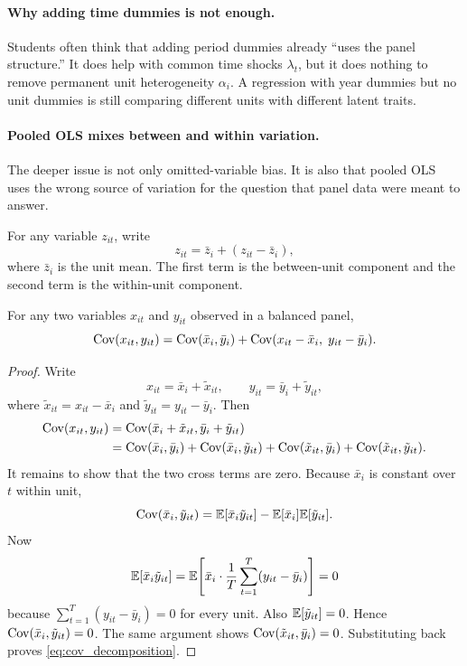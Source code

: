 \paragraph{Why adding time dummies is not enough.}
Students often think that adding period dummies already ``uses the panel structure.'' It does help with common time shocks $\lambda_t$, but it does nothing to remove permanent unit heterogeneity $\alpha_i$. A regression with year dummies but no unit dummies is still comparing different units with different latent traits.

\paragraph{Pooled \ac{OLS} mixes between and within variation.}
The deeper issue is not only omitted-variable bias. It is also that pooled \ac{OLS} uses the wrong source of variation for the question that panel data were meant to answer.

For any variable $z_{it}$, write
\[
z_{it} = \bar{z}_i + (z_{it}-\bar{z}_i),
\]
where $\bar{z}_i$ is the unit mean. The first term is the between-unit component and the second term is the within-unit component.

\begin{thmN}
For any two variables $x_{it}$ and $y_{it}$ observed in a balanced panel,
\begin{equation}
\operatorname{Cov}(x_{it},y_{it})
= \operatorname{Cov}(\bar{x}_i,\bar{y}_i)
  + \operatorname{Cov}(x_{it}-\bar{x}_i,\; y_{it}-\bar{y}_i).
\label{eq:cov_decomposition}
\end{equation}
\end{thmN}

\begin{proof}
Write
\[
x_{it} = \bar{x}_i + \tilde{x}_{it},
\qquad
y_{it} = \bar{y}_i + \tilde{y}_{it},
\]
where $\tilde{x}_{it}=x_{it}-\bar{x}_i$ and $\tilde{y}_{it}=y_{it}-\bar{y}_i$. Then
\begin{align*}
\operatorname{Cov}(x_{it},y_{it})
&= \operatorname{Cov}(\bar{x}_i+\tilde{x}_{it},\bar{y}_i+\tilde{y}_{it}) \\
&= \operatorname{Cov}(\bar{x}_i,\bar{y}_i)
 + \operatorname{Cov}(\bar{x}_i,\tilde{y}_{it})
 + \operatorname{Cov}(\tilde{x}_{it},\bar{y}_i)
 + \operatorname{Cov}(\tilde{x}_{it},\tilde{y}_{it}).
\end{align*}
It remains to show that the two cross terms are zero. Because $\bar{x}_i$ is constant over $t$ within unit,
\[
\operatorname{Cov}(\bar{x}_i,\tilde{y}_{it})
= \mathbb{E}[\bar{x}_i\tilde{y}_{it}] - \mathbb{E}[\bar{x}_i]\mathbb{E}[\tilde{y}_{it}].
\]
Now
\[
\mathbb{E}[\bar{x}_i\tilde{y}_{it}]
= \mathbb{E}\!\left[\bar{x}_i \cdot \frac{1}{T}\sum_{t=1}^T (y_{it}-\bar{y}_i)\right]
= 0
\]
because $\sum_{t=1}^T (y_{it}-\bar{y}_i)=0$ for every unit. Also $\mathbb{E}[\tilde{y}_{it}]=0$. Hence $\operatorname{Cov}(\bar{x}_i,\tilde{y}_{it})=0$. The same argument shows $\operatorname{Cov}(\tilde{x}_{it},\bar{y}_i)=0$. Substituting back proves \eqref{eq:cov_decomposition}.
\end{proof}

